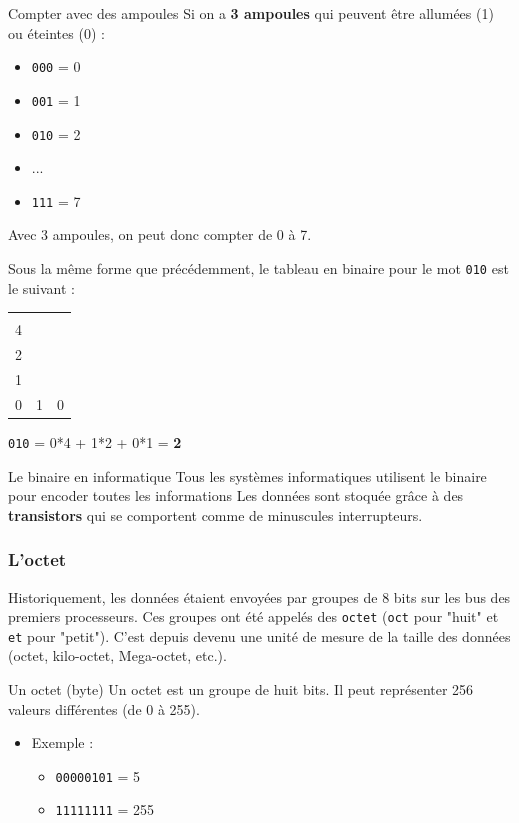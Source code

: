 \begin{UPSTIexemples}{Compter avec des ampoules}
	Si on a \textbf{3 ampoules} qui peuvent être allumées (1) ou éteintes (0) :
	\begin{itemize}
		\item \texttt{000} = 0
		\item \texttt{001} = 1
		\item \texttt{010} = 2
		\item ...
		\item \texttt{111} = 7
	\end{itemize}

	Avec 3 ampoules, on peut donc compter de 0 à 7.

	Sous la même forme que précédemment, le tableau en binaire pour le mot \texttt{010} est le suivant :
	\begin{center}
		\begin{tabular}{|l|l|l|}
			\hline
			\makecell[tl]{$2^{2}$         \\ 4} & \makecell[tl]{$2^{1}$\\  2} & \makecell[tl]{$2^{0}$ \\1} \\
			\hline
			0 & 1 & 0 \\
			\hline
		\end{tabular}
	\end{center}
	\texttt{010} = 0*4 + 1*2 + 0*1 = \textbf{2}
\end{UPSTIexemples}

\begin{UPSTIinfor}{Le binaire en informatique}
	Tous les systèmes informatiques utilisent le binaire pour encoder toutes les informations
	Les données sont stoquée grâce à des \textbf{transistors} qui se comportent comme de minuscules interrupteurs.
\end{UPSTIinfor}

\subsubsection{L’octet}

Historiquement, les données étaient envoyées par groupes de 8 bits sur les bus des premiers processeurs.
Ces groupes ont été appelés des \texttt{octet} (\texttt{oct} pour "huit" et \texttt{et} pour "petit").
C'est depuis devenu une unité de mesure de la taille des données (octet, kilo-octet, Mega-octet, etc.).

\begin{UPSTIinfor}{Un octet (byte)}
	Un octet est un groupe de huit bits. Il peut représenter 256 valeurs différentes (de 0 à 255).
	\begin{itemize}
		\item Exemple :
		      \begin{itemize}
			      \item \texttt{00000101} = 5
			      \item \texttt{11111111} = 255
		      \end{itemize}
	\end{itemize}
\end{UPSTIinfor}

